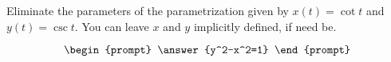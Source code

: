 \documentclass{ximera}
\author{Gregory Hartman \and Matthew Carr}
\begin{document}
\begin{exercise}




Eliminate the parameters of the parametrization given by $x(t)=\cot t$ and $y(t)=\csc t$. You can leave $x$ and $y$ implicitly defined, if need be.

\[
\begin{prompt}
\answer{y^2-x^2=1}
\end{prompt}
\]

\end{exercise}
\end{document}
